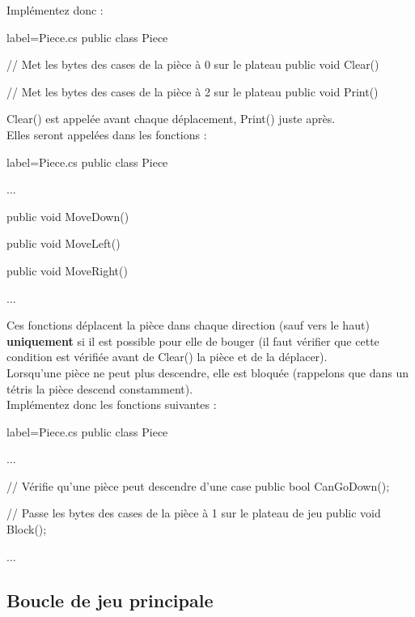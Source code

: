\documentclass[a4paper]{article}
\begin{document}
Implémentez donc : \\

\begin{csharpcode*}{label=Piece.cs}
public class Piece
{
    // Met les bytes des cases de la pièce à 0 sur le plateau
    public void Clear(){}

    // Met les bytes des cases de la pièce à 2 sur le plateau
    public void Print(){}
}
\end{csharpcode*}

Clear() est appelée avant chaque déplacement, Print() juste après. \\

Elles seront appelées dans les fonctions : \\

\begin{csharpcode*}{label=Piece.cs}
public class Piece
{
    ...

    public void MoveDown(){}

    public void MoveLeft(){}

    public void MoveRight(){}

    ...
}
\end{csharpcode*}

\vspace{0.2cm}

Ces fonctions déplacent la pièce dans chaque direction (sauf vers le haut)
\textbf{uniquement} si il est possible pour elle de bouger (il faut vérifier
que cette condition est vérifiée avant de Clear() la pièce et de la déplacer). \\

Lorsqu'une pièce ne peut plus descendre, elle est bloquée (rappelons que dans un tétris la pièce
descend constamment). \\

Implémentez donc les fonctions suivantes : \\

\begin{csharpcode*}{label=Piece.cs}
public class Piece
{
    ...

    // Vérifie qu'une pièce peut descendre d'une case
    public bool CanGoDown();

    // Passe les bytes des cases de la pièce à 1 sur le plateau de jeu
    public void Block();

    ...
}
\end{csharpcode*}

\subsection{Boucle de jeu principale}
\end{document}
